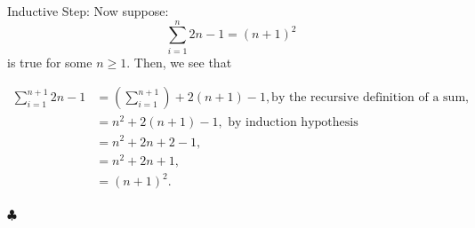 \documentclass{article}
\begin{document}
Inductive Step: Now suppose: $$\sum_{i=1}^{n} 2n - 1 = (n+1)^2$$ is true for some $n \ge 1$. Then, we see that

\begin{align*}
\sum_{i=1}^{n+1} 2n - 1 &= \left(\sum_{i=1}^{n+1}\right) + 2(n+1) - 1, \text{by the recursive definition of a sum,} \\
                        &= n^2 + 2(n+1) - 1, \text{ by induction hypothesis}\\
                        &= n^2 + 2n + 2 -1,\\
                        &= n^2 + 2n + 1, \\
                        &= (n+1)^2 .\\
\end{align*}

$\clubsuit$
\end{document}
